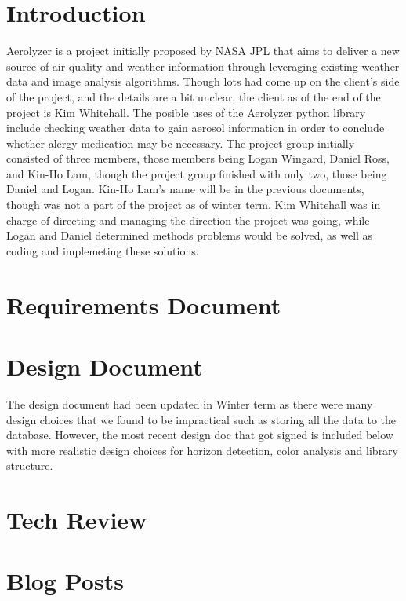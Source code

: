 \documentclass[onecolumn, draftclsnofoot,10pt, compsoc]{IEEEtran}
\begin{document}
\tableofcontents
\clearpage

\begin{singlespace}

	\section{Introduction}
		Aerolyzer is a project initially proposed by NASA JPL that aims to deliver a new source of air quality and weather information through leveraging existing weather data and image analysis algorithms.
		Though lots had come up on the client's side of the project, and the details are a bit unclear, the client as of the end of the project is Kim Whitehall.
		The posible uses of the Aerolyzer python library include checking weather data to gain aerosol information in order to conclude whether alergy medication may be necessary.
		The project group initially consisted of three members, those members being Logan Wingard, Daniel Ross, and Kin-Ho Lam, though the project group finished with only two, those being Daniel and Logan.
		Kin-Ho Lam's name will be in the previous documents, though was not a part of the project as of winter term.
		Kim Whitehall was in charge of directing and managing the direction the project was going, while Logan and Daniel determined methods problems would be solved, as well as coding and implemeting these solutions.
		
	\section{Requirements Document}
		
	\section{Design Document}
		The design document had been updated in Winter term as there were many design choices that we found to be impractical such as storing all the data to the database. 
		However, the most recent design doc that got signed is included below with more realistic design choices for horizon detection, color analysis and library structure.
		
	\section{Tech Review}
		
	\section{Blog Posts}

\end{singlespace}
\end{document}
